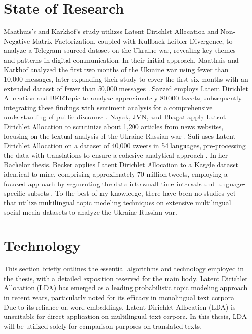 \documentclass[
    11pt,
    a4paper,
    egregdoesnotlikesansseriftitles,
    toc=chapterentrywithdots,
    oneside,openright,
    titlepage,
    parskip=half,
    headings=normal,  %
    listof=totoc,
    bibliography=totoc,
    index=totoc,
    captions=tableheading,  %
    chapterprefix,
    listof=flat,
    final
]{scrbook}
\begin{document}


{\let\clearpage\relax \chapter{State of Research}}

Maathuis's and Karkhof's study utilizes Latent Dirichlet Allocation and Non-Negative Matrix Factorization, coupled with Kullback-Leibler Divergence, to analyze a Telegram-sourced dataset on the Ukraine war, revealing key themes and patterns in digital communication.
In their initial approach, Maathuis and Karkhof analyzed the first two months of the Ukraine war using fewer than 10,000 messages, later expanding their study to cover the first six months with an extended dataset of fewer than 50,000 messages \cite{TopicModellingTelegram1,TopicModellingTelegram2}. 
Sazzed employs Latent Dirichlet Allocation and BERTopic to analyze approximately 80,000 tweets, subsequently integrating these findings with sentiment analysis for a comprehensive understanding of public discourse \cite{TopicTwitterLDABERt}. 
Nayak, JVN, and Bhagat apply Latent Dirichlet Allocation to scrutinize about 1,200 articles from news websites, focusing on the textual analysis of the Ukraine-Russian war \cite{TopicModelingconflig}.
Sufi uses Latent Dirichlet Allocation on a dataset of 40,000 tweets in 54 languages, pre-processing the data with translations to ensure a cohesive analytical approach \cite{SocialMediaanalysis}.
In her Bachelor thesis, Becker applies Latent Dirichlet Allocation to a Kaggle dataset identical to mine, comprising approximately 70 million tweets, employing a focused approach by segmenting the data into small time intervals and language-specific subsets \cite{Ivanna}.
To the best of my knowledge, there have been no studies yet that utilize multilingual topic modeling techniques on extensive multilingual social media datasets to analyze the Ukraine-Russian war.



{\let\clearpage\relax \chapter{Technology}}
This section briefly outlines the essential algorithms and technology employed in the thesis, with a detailed exposition reserved for the main body.
Latent Dirichlet Allocation (LDA)  \cite{LDA} has emerged as a leading probabilistic topic modeling approach in recent years, particularly noted for its efficacy in monolingual text corpora. Due to its reliance on word embeddings, Latent Dirichlet Allocation (LDA) is unsuitable for direct application on multilingual text corpora. In this thesis, LDA will be utilized solely for comparison purposes on translated texts.
\end{document}
